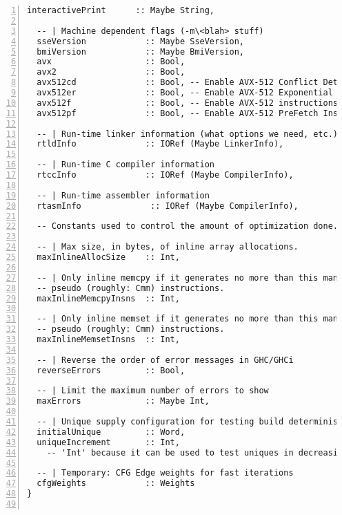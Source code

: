 \documentclass[en]{pracamgr}
\begin{document}
\begin{lstlisting}[numbers=left,stepnumber=1]
  interactivePrint      :: Maybe String,

  -- | Machine dependent flags (-m\<blah> stuff)
  sseVersion            :: Maybe SseVersion,
  bmiVersion            :: Maybe BmiVersion,
  avx                   :: Bool,
  avx2                  :: Bool,
  avx512cd              :: Bool, -- Enable AVX-512 Conflict Detection Instructions.
  avx512er              :: Bool, -- Enable AVX-512 Exponential and Reciprocal Instructions.
  avx512f               :: Bool, -- Enable AVX-512 instructions.
  avx512pf              :: Bool, -- Enable AVX-512 PreFetch Instructions.

  -- | Run-time linker information (what options we need, etc.)
  rtldInfo              :: IORef (Maybe LinkerInfo),

  -- | Run-time C compiler information
  rtccInfo              :: IORef (Maybe CompilerInfo),

  -- | Run-time assembler information
  rtasmInfo              :: IORef (Maybe CompilerInfo),

  -- Constants used to control the amount of optimization done.

  -- | Max size, in bytes, of inline array allocations.
  maxInlineAllocSize    :: Int,

  -- | Only inline memcpy if it generates no more than this many
  -- pseudo (roughly: Cmm) instructions.
  maxInlineMemcpyInsns  :: Int,

  -- | Only inline memset if it generates no more than this many
  -- pseudo (roughly: Cmm) instructions.
  maxInlineMemsetInsns  :: Int,

  -- | Reverse the order of error messages in GHC/GHCi
  reverseErrors         :: Bool,

  -- | Limit the maximum number of errors to show
  maxErrors             :: Maybe Int,

  -- | Unique supply configuration for testing build determinism
  initialUnique         :: Word,
  uniqueIncrement       :: Int,
    -- 'Int' because it can be used to test uniques in decreasing order.

  -- | Temporary: CFG Edge weights for fast iterations
  cfgWeights            :: Weights
}
  
\end{lstlisting}
\end{document}
